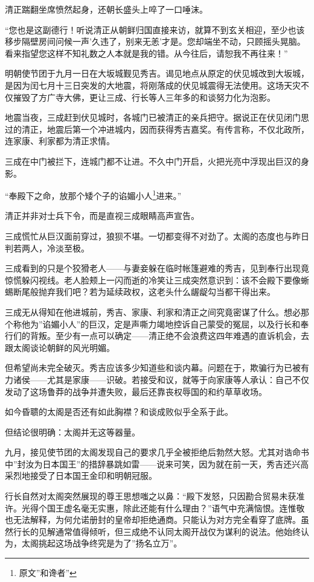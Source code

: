\documentclass[
]{book}
\begin{document}
清正踹翻坐席愤然起身，还朝长盛头上啐了一口唾沫。

``您也是这副德行！听说清正从朝鲜归国直接来访，就算不到玄关相迎，至少也该移步隔壁房间问候一声'久违了，别来无恙'才是。您却端坐不动，只顾摇头晃脑。看来指望您这样不知礼数之人本就是我的错。从今往后，请恕我不再往来！''

明朝使节团于九月一日在大坂城觐见秀吉。谒见地点从原定的伏见城改到大坂城，是因为闰七月十三日突发的大地震，将刚落成的伏见城震得无法使用。这场天灾不仅摧毁了方广寺大佛，更让三成、行长等人三年多的和谈努力化为泡影。

地震当夜，三成赶到伏见城时，各城门已被清正的亲兵把守。据说正在伏见闭门思过的清正，地震后第一个冲进城内，因而获得秀吉嘉奖。有传言称，不仅北政所，连家康、利家都为清正求情。

三成在中门被拦下，连城门都不让进。不久中门开启，火把光亮中浮现出巨汉的身影。

``奉殿下之命，放那个矮个子的谄媚小人\footnote{原文''和谗者''}进来。''

清正并非对士兵下令，而是直视三成眼睛高声宣告。

三成慌忙从巨汉面前穿过，狼狈不堪。一切都变得不对劲了。太阁的态度也与昨日判若两人，冷淡至极。

三成看到的只是个狡猾老人------与妻妾躲在临时帐篷避难的秀吉，见到奉行出现竟惊慌躲闪视线。老人脸颊上一闪而逝的冷笑让三成突然意识到：该不会殿下要像蜥蜴断尾般抛弃我们吧？若为延续政权，这老头什么龌龊勾当都干得出来。

三成无从得知在他进城前，秀吉、家康、利家和清正之间究竟密谋了什么。想必那个称他为''谄媚小人''的巨汉，定是声嘶力竭地控诉自己蒙受的冤屈，以及行长和奉行们的背叛。至少有一点可以确定------清正绝不会浪费这四年难遇的直诉机会，去跟太阁谈论朝鲜的风光明媚。

但希望尚未完全破灭。秀吉应该多少知道些和谈内幕。问题在于，欺骗行为已被有力诸侯------尤其是家康------识破。若接受和议，就等于向家康等人承认：自己不仅发动了这场鲁莽的战争并遭失败，最后还靠丧权辱国的和约草草收场。

如今昏聩的太阁是否还有如此胸襟？和谈成败似乎全系于此。

但结论很明确：太阁并无这等器量。

九月，接见使节团的太阁发现自己的要求几乎全被拒绝后勃然大怒。尤其对诰命书中''封汝为日本国王''的措辞暴跳如雷------说来可笑，因为就在前一天，秀吉还兴高采烈地接受了日本国王金印和明朝冠服。

行长自然对太阁突然展现的尊王思想嗤之以鼻：``殿下发怒，只因勘合贸易未获准许。光得个国王虚名毫无实惠，除此还能有什么理由？''语气中充满恼恨。连惟敬也无法解释，为何允诺册封的皇帝却拒绝通商。只能认为对方完全看穿了底牌。虽然行长的见解通常值得倾听，但三成绝不认同太阁开战仅为谋利的说法。他始终认为，太阁挑起这场战争终究是为了''扬名立万''。
\end{document}
